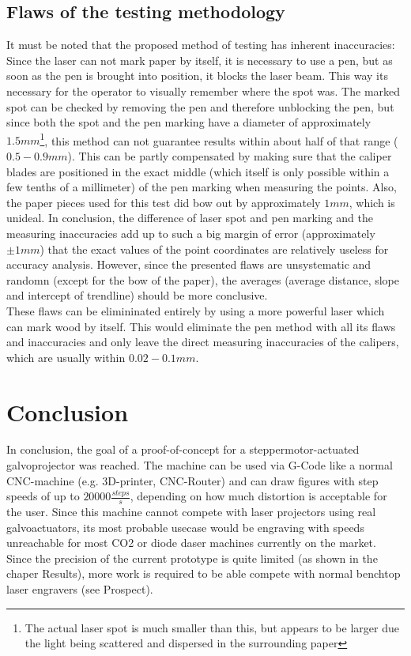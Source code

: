 \documentclass[a4paper, 11pt]{scrartcl}
\begin{document}
\subsection{Flaws of the testing methodology} It must be noted that the proposed method of testing has inherent inaccuracies: Since the laser can not mark paper by itself, it is necessary to use a pen, but as soon as the pen is brought into position, it blocks the laser beam. This way its necessary for the operator to visually remember where the spot was. The marked spot can be checked by removing the pen and therefore unblocking the pen, but since both the spot and the pen marking have a diameter of approximately $1.5mm$\footnote{The actual laser spot is much smaller than this, but appears to be larger due the light  being scattered and dispersed in the surrounding paper}, this method can not guarantee results within about half of that range ($0.5 - 0.9 mm$). This can be partly compensated by making sure that the caliper blades are positioned in the exact middle (which itself is only possible within a few tenths of a millimeter) of the pen marking when measuring the points. Also, the paper pieces used for this test did bow out by approximately $1mm$, which is unideal. In conclusion, the difference of laser spot and pen marking and the measuring inaccuracies add up to such a big margin of error (approximately $\pm 1mm$) that the exact values of the point coordinates are relatively useless for accuracy analysis. However, since the presented flaws are unsystematic and randomn (except for the bow of the paper), the averages (average distance, slope and intercept of trendline) should be more conclusive. \\
These flaws can be elimininated entirely by using a more powerful laser which can mark wood by itself. This would eliminate the pen method with all its flaws and inaccuracies and only leave the direct measuring inaccuracies of the calipers, which are usually within $0.02 - 0.1mm$. \\

\section{Conclusion}
In conclusion, the goal of a proof-of-concept for a steppermotor-actuated galvoprojector was reached. The machine can be used via G-Code like a normal CNC-machine (e.g. 3D-printer, CNC-Router) and can draw figures with step speeds of up to $20000 \frac{steps}{s}$, depending on how much distortion is acceptable for the user. Since this machine cannot compete with laser projectors using real galvoactuators, its most probable usecase would be engraving with speeds unreachable for most CO2 or diode daser machines currently on the market. Since the precision of the current prototype is quite limited (as shown in the chaper Results), more work is required to be able compete with normal benchtop laser engravers (see Prospect).
\end{document}
